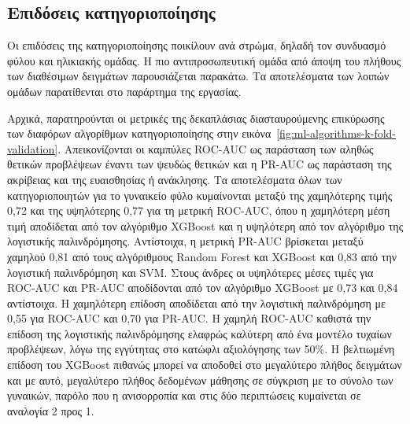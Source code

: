 \documentclass[12pt]{report}
\begin{document}
        \subsection{Επιδόσεις κατηγοριοποίησης}
                Οι επιδόσεις της κατηγοριοποίησης ποικίλουν ανά στρώμα, δηλαδή τον συνδυασμό φύλου και ηλικιακής ομάδας. Η πιο αντιπροσωπευτική ομάδα από άποψη του πλήθους των διαθέσιμων δειγμάτων παρουσιάζεται παρακάτω. Τα αποτελέσματα των λοιπών ομάδων παρατίθενται στο παράρτημα της εργασίας.
            \par
                Αρχικά, παρατηρούνται οι μετρικές της δεκαπλάσιας διασταυρούμενης επικύρωσης των διαφόρων αλγορίθμων κατηγοριοποίησης στην εικόνα~\ref{fig:ml-algorithms-k-fold-validation}. Απεικονίζονται οι καμπύλες ROC-AUC ως παράσταση των αληθώς θετικών προβλέψεων έναντι των ψευδώς θετικών και η PR-AUC ως παράσταση της ακρίβειας και της ευαισθησίας ή ανάκλησης. Τα αποτελέσματα όλων των κατηγοριοποιητών για το γυναικείο φύλο κυμαίνονται μεταξύ της χαμηλότερης τιμής 0,72 και της υψηλότερης 0,77 για τη μετρική ROC-AUC, όπου η χαμηλότερη μέση τιμή αποδίδεται από τον αλγόριθμο XGBoost και η υψηλότερη από τον αλγόριθμο της λογιστικής παλινδρόμησης. Αντίστοιχα, η μετρική PR-AUC βρίσκεται μεταξύ χαμηλού 0,81 από τους αλγόριθμους Random Forest και XGBoost και 0,83 από την λογιστική παλινδρόμηση και SVM. Στους άνδρες οι υψηλότερες μέσες τιμές για ROC-AUC και PR-AUC αποδίδονται από τον αλγόριθμο XGBoost με 0,73 και 0,84 αντίστοιχα. Η χαμηλότερη επίδοση αποδίδεται από την λογιστική παλινδρόμηση με 0,55 για ROC-AUC και 0,70 για PR-AUC. Η χαμηλή ROC-AUC καθιστά την επίδοση της λογιστικής παλινδρόμησης ελαφρώς καλύτερη από ένα μοντέλο τυχαίων προβλέψεων, λόγω της εγγύτητας στο κατώφλι αξιολόγησης των 50\%. Η βελτιωμένη επίδοση του XGBoost πιθανώς μπορεί να αποδοθεί στο μεγαλύτερο πλήθος δειγμάτων και με αυτό, μεγαλύτερο πλήθος δεδομένων μάθησης σε σύγκριση με το σύνολο των γυναικών, παρόλο που η ανισορροπία και στις δύο περιπτώσεις κυμαίνεται σε αναλογία 2 προς 1.      
                \newpage
\end{document}
